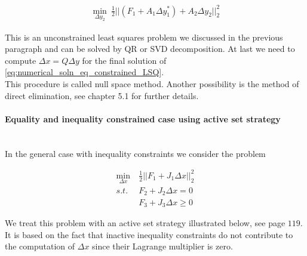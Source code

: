 \documentclass{scrartcl}[12pt, halfparskip]
\numberwithin{equation}{section}
\numberwithin{figure}{section}
\numberwithin{table}{section}
\begin{document}
\begin{align}
	\min_{\Delta y_2} \ \frac{1}{2} || (F_1 + A_1 \Delta y_1^*) + A_2 \Delta y_2 ||_2^2
\end{align}

This is an unconstrained least squares problem we discussed in the previous paragraph and can be solved by QR or SVD decomposition. At last we need to compute $\Delta x = Q \Delta y$ for the final solution of \cref{eq:numerical_soln_eq_constrained_LSQ}. \\

This procedure is called null space method. Another possibility is the method of direct elimination, see \cite{numerical_methods_lsq_Bjorck} chapter 5.1 for further details.


\paragraph{Equality and inequality constrained case using active set strategy} \label{par:theory_active_set_strategy} \mbox{}\\
In the general case with inequality constraints we consider the problem

\begin{align}
\min_{\Delta x} & \ \frac{1}{2} || F_1 + J_1 \Delta x ||_2^2 \label{eq:numerical_soln_ineq_constrained_LSQ} \\
s.t. & \ F_2 + J_2 \Delta x = 0 \nonumber \\
&  \ F_3 + J_3 \Delta x \ge 0 \nonumber
\end{align}

We treat this problem with an active set strategy illustrated below, see \cite{diss_bock} page $119$. It is based on the fact that inactive inequality constraints do not contribute to the computation of $\Delta x$ since their Lagrange multiplier is zero.
\end{document}
